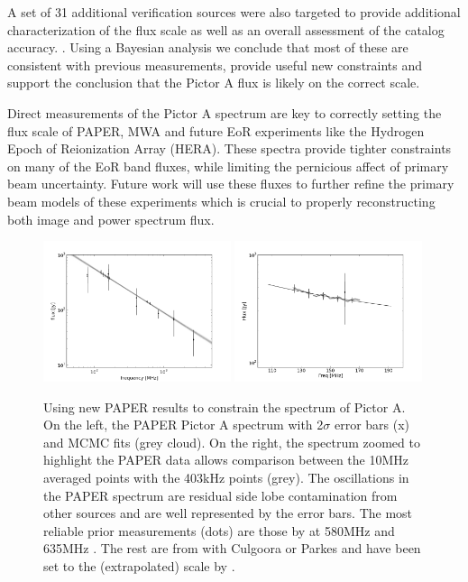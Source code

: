 \documentclass[preprint]{aastex}
\begin{document}
A set of  31 additional verification sources were also targeted to provide additional 
characterization of the flux scale as well as an overall assessment of the catalog accuracy.
.  Using a Bayesian analysis we conclude that most of
these are consistent with previous measurements, provide useful new
constraints and support the conclusion that the  Pictor A flux is likely on the correct scale.

Direct measurements of the Pictor A spectrum are key to correctly setting the
flux scale of PAPER, MWA and future EoR experiments like the Hydrogen Epoch of Reionization Array (HERA).
These spectra provide tighter constraints on many of the EoR band fluxes, while
limiting the pernicious affect of primary beam uncertainty.  Future work will use these
fluxes to further  refine the primary beam models of these experiments which is crucial to properly reconstructing
both image and power spectrum flux.




\begin{figure}[htbp]
\includegraphics[width=0.49\textwidth]{plots/pictor_spectrum.png}
\includegraphics[width=0.49\textwidth]{plots/pictor_spectrum_zoom.png}
\caption{
Using new PAPER results to constrain the spectrum of Pictor A.  On the left,
the PAPER Pictor A spectrum with 2$\sigma$ error bars (x) and  MCMC fits (grey
cloud). On the right, the spectrum zoomed to highlight the PAPER data
 allows comparison between the 10MHz averaged points with the
403kHz points (grey). The oscillations in the PAPER spectrum are residual side
lobe contamination from other sources and are well represented by the error
bars.  The most reliable prior measurements (dots) are those by
\cite{Wills:1975p9314} at 580MHz and 635MHz \citep{Perley:1997p9312}. The rest
are from with Culgoora \cite{Slee:1995p7541} or Parkes
\cite{Otrupcek:1991p8780} and have been set to the (extrapolated)
\citet{Baars:1977p9678} scale by  \cite{Kuehr:1981p9628}. 
} \label{fig:pic_spectrum}
\end{figure}
\end{document}
